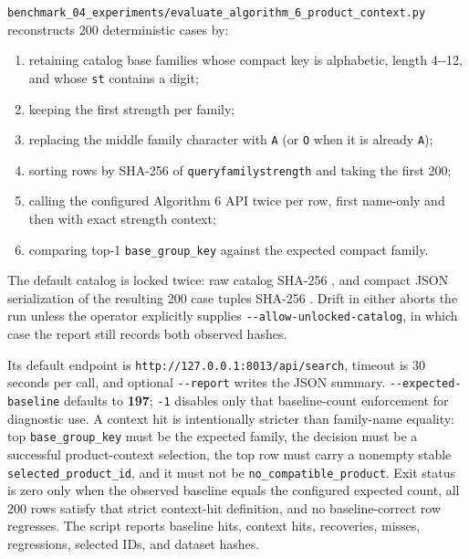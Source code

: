 \texttt{benchmark\_\allowbreak{}04\_\allowbreak{}experiments/evaluate\_\allowbreak{}algorithm\_\allowbreak{}6\_\allowbreak{}product\_\allowbreak{}context.py} reconstructs 200 deterministic cases by:

\begin{enumerate}
\def\labelenumi{\arabic{enumi}.}
\tightlist
\item
  retaining catalog base families whose compact key is alphabetic, length 4-\/-12, and whose \texttt{st} contains a digit;
\item
  keeping the first strength per family;
\item
  replacing the middle family character with \texttt{A} (or \texttt{O} when it is already \texttt{A});
\item
  sorting rows by SHA-256 of \texttt{query\textbar{}family\textbar{}strength} and taking the first 200;
\item
  calling the configured Algorithm 6 API twice per row, first name-only and then with exact strength context;
\item
  comparing top-1 \texttt{base\_\allowbreak{}group\_\allowbreak{}key} against the expected compact family.
\end{enumerate}

The default catalog is locked twice: raw catalog SHA-256 \texttt{}, and compact JSON serialization of the resulting 200 case tuples SHA-256 \texttt{}. Drift in either aborts the run unless the operator explicitly supplies \texttt{-\/-allow-unlocked-catalog}, in which case the report still records both observed hashes.

Its default endpoint is \texttt{http://127.0.0.1:8013/api/search}, timeout is 30 seconds per call, and optional \texttt{-\/-report} writes the JSON summary. \texttt{-\/-expected-baseline} defaults to \textbf{197}; \texttt{-1} disables only that baseline-count enforcement for diagnostic use. A context hit is intentionally stricter than family-name equality: top \texttt{base\_\allowbreak{}group\_\allowbreak{}key} must be the expected family, the decision must be a successful product-context selection, the top row must carry a nonempty stable \texttt{selected\_\allowbreak{}product\_\allowbreak{}id}, and it must not be \texttt{no\_\allowbreak{}compatible\_\allowbreak{}product}. Exit status is zero only when the observed baseline equals the configured expected count, all 200 rows satisfy that strict context-hit definition, and no baseline-correct row regresses. The script reports baseline hits, context hits, recoveries, misses, regressions, selected IDs, and dataset hashes.

